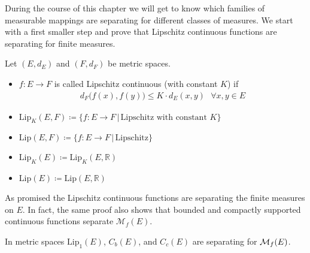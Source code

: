 During the course of this chapter we will get to know which families of measurable mappings are separating for different classes of measures. We start with a first smaller step and prove that Lipschitz continuous functions are separating for finite measures.
\begin{ldef}
\begin{deff}
	Let $(E,d_E)$ and $(F,d_F)$ be metric spaces.
	\begin{itemize}
		\item
			$f\colon E \to F$ is called Lipschitz continuous (with constant $K$) if 
			\begin{align*}
				d_F \big( f(x),f(y) \big) \leq K \cdot d_E(x,y) \:\:\: \forall x,y\in E
			\end{align*}
		\item
			$\text{Lip}_K(E,F) \coloneqq \{ f\colon E\to F \,|\, \text{Lipschitz with constant }K \}$
		\item
			$\text{Lip}(E,F) \coloneqq \{ f\colon E\to F \,|\, \text{Lipschitz}\}$
		\item
			$\text{Lip}_K(E) \coloneqq \text{Lip}_K(E,\mathbb{R})$
		\item $\text{Lip}(E) \coloneqq \text{Lip}(E,\mathbb{R})$
	\end{itemize}
\end{deff}
\end{ldef}
As promised the Lipschitz continuous functions are separating the finite measures on $E$. In fact, the same proof also shows that bounded and compactly supported continuous functions separate $\mathcal M_f(E)$. 
\begin{lAussageWerkzeug}
\begin{prop}\label{theorem_4124}
	In metric spaces $\text{Lip}_1(E)$, $C_b(E)$, and $C_c(E)$ are separating for $\mathcal{M}_f(E)$.
\end{prop}
\end{lAussageWerkzeug}
